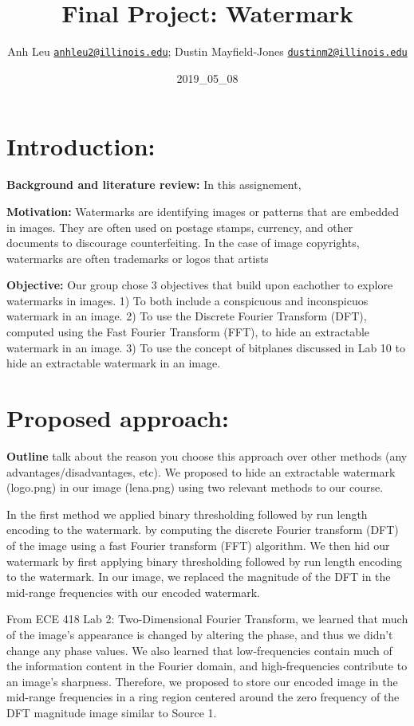 \documentclass[]{article}
\title{Final Project: Watermark}
\author{Anh Leu
\href{mailto:anhleu2@illinois.edu}{\nolinkurl{anhleu2@illinois.edu}};
Dustin Mayfield-Jones
\href{mailto:dustinm2@illinois.edu}{\nolinkurl{dustinm2@illinois.edu}}}
\date{2019\_05\_08}
\begin{document}
\maketitle

\hypertarget{introduction}{%
\section{Introduction:}\label{introduction}}

\textbf{Background and literature review: } In this assignement,

\textbf{Motivation: } Watermarks are identifying images or patterns that
are embedded in images. They are often used on postage stamps, currency,
and other documents to discourage counterfeiting. In the case of image
copyrights, watermarks are often trademarks or logos that artists

\textbf{Objective: } Our group chose 3 objectives that build upon
eachother to explore watermarks in images. 1) To both include a
conspicuous and inconspicuos watermark in an image. 2) To use the
Discrete Fourier Transform (DFT), computed using the Fast Fourier
Transform (FFT), to hide an extractable watermark in an image. 3) To use
the concept of bitplanes discussed in Lab 10 to hide an extractable
watermark in an image.

\hypertarget{proposed-approach}{%
\section{Proposed approach:}\label{proposed-approach}}

\textbf{Outline} talk about the reason you choose this approach over
other methods (any advantages/disadvantages, etc). We proposed to hide
an extractable watermark (logo.png) in our image (lena.png) using two
relevant methods to our course.

In the first method we applied binary thresholding followed by run
length encoding to the watermark. by computing the discrete Fourier
transform (DFT) of the image using a fast Fourier transform (FFT)
algorithm. We then hid our watermark by first applying binary
thresholding followed by run length encoding to the watermark. In our
image, we replaced the magnitude of the DFT in the mid-range frequencies
with our encoded watermark.

From ECE 418 Lab 2: Two-Dimensional Fourier Transform, we learned that
much of the image's appearance is changed by altering the phase, and
thus we didn't change any phase values. We also learned that
low-frequencies contain much of the information content in the Fourier
domain, and high-frequencies contribute to an image's sharpness.
Therefore, we proposed to store our encoded image in the mid-range
frequencies in a ring region centered around the zero frequency of the
DFT magnitude image similar to Source 1.
\end{document}

